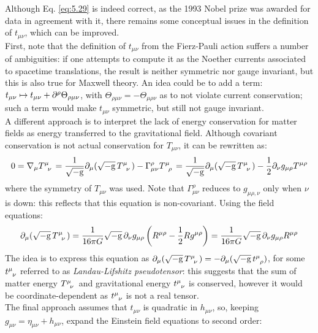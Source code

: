 Although Eq. \ref{eq:5.29} is indeed correct, as the 1993 Nobel prize was awarded for data in agreement with it, there remains some conceptual issues in the definition of $ t_{\mu \nu} $, which can be improved.\\
First, note that the definition of $ t_{\mu \nu} $ from the Fierz-Pauli action suffers a number of ambiguities: if one attempts to compute it as the Noether currents associated to spacetime translations, the result is neither symmetric nor gauge invariant, but this is also true for Maxwell theory. An idea could be to add a term: $ t_{\mu \nu} \mapsto t_{\mu \nu} + \partial^\rho \Theta_{\rho \mu \nu} $, with $ \Theta_{\rho \mu \nu} = - \Theta_{\mu \rho \nu} $ as to not violate current conservation; such a term would make $ t_{\mu \nu} $ symmetric, but still not gauge invariant.\\
A different approach is to interpret the lack of energy conservation for matter fields as energy transferred to the gravitational field. Although covariant conservation is not actual conservation for $ T_{\mu \nu} $, it can be rewritten as:
\begin{equation*}
  0 = \na_\mu \tensor{T}{^\mu_\nu} = \frac{1}{\sqgm} \pa_\mu (\sqgm\, \tensor{T}{^\mu_\nu}) - \Gamma^\rho_{\mu \nu} \tensor{T}{^\mu_\rho} = \frac{1}{\sqgm} \pa_\mu (\sqgm\, \tensor{T}{^\mu_\nu}) - \frac{1}{2} \pa_\nu g_{\mu \rho} T^{\mu \rho}
\end{equation*}
where the symmetry of $ T_{\mu \nu} $ was used. Note that $ \Gamma^\rho_{\mu \nu} $ reduces to $ g_{\mu \rho , \nu} $ only when $ \nu $ is down: this reflects that this equation is non-covariant. Using the field equations:
\begin{equation*}
  \pa_\mu (\sqgm\, \tensor{T}{^\mu_\nu}) = \frac{1}{16\pi G} \sqgm\, \pa_\nu g_{\mu \rho} \left( R^{\mu \rho} - \frac{1}{2} R g^{\mu \rho} \right) = \frac{1}{16\pi G} \sqgm\, \pa_\nu g_{\mu \rho} R^{\mu \rho}
\end{equation*}
The idea is to express this equation as $ \pa_\mu (\sqgm\, \tensor{T}{^\mu_\nu}) = - \pa_\mu (\sqgm\, \tensor{t}{^\mu_\rho}) $, for some $ \tensor{t}{^\mu_\nu} $ referred to as \textit{Landau-Lifshitz pseudotensor}: this suggests that the sum of matter energy $ \tensor{T}{^\mu_\nu} $ and gravitational energy $ \tensor{t}{^\mu_\nu} $ is conserved, however it would be coordinate-dependent as $ \tensor{t}{^\mu_\nu} $ is not a real tensor.\\
The final approach assumes that $ t_{\mu \nu} $ is quadratic in $ h_{\mu \nu} $, so, keeping $ g_{\mu \nu} = \eta_{\mu \nu} + h_{\mu \nu} $, expand the Einstein field equations to second order:
